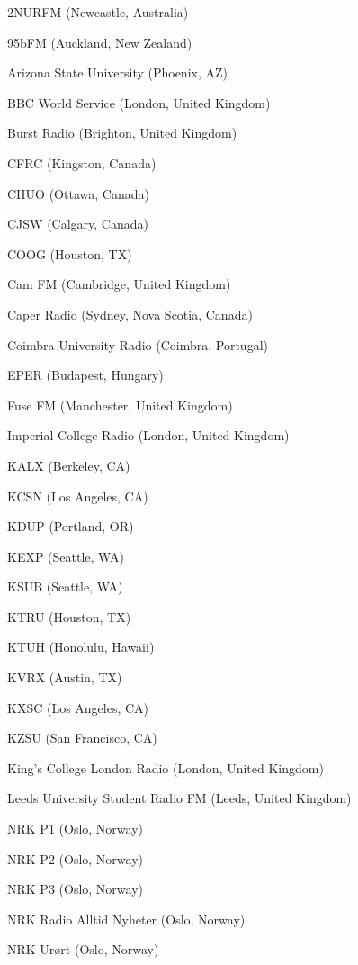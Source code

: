 \documentclass[20pt,landscape]{foils}
\begin{document}
\begin{list1}
\item
  \begin{list2}
  \item 2NURFM (Newcastle, Australia)
  \item 95bFM (Auckland, New Zealand)
  \item Arizona State University (Phoenix, AZ)
  \item BBC World Service (London, United Kingdom)
  \item Burst Radio (Brighton, United Kingdom)
  \item CFRC (Kingston, Canada)
  \item CHUO (Ottawa, Canada)
  \item CJSW (Calgary, Canada)
  \item COOG (Houston, TX)
  \item Cam FM (Cambridge, United Kingdom)
  \item Caper Radio (Sydney, Nova Scotia, Canada)
  \item Coimbra University Radio (Coimbra, Portugal)
  \item EPER (Budapest, Hungary)
  \item Fuse FM (Manchester, United Kingdom)
  \item Imperial College Radio (London, United Kingdom)
  \item KALX (Berkeley, CA)
  \item KCSN (Los Angeles, CA)
  \item KDUP (Portland, OR)
  \item KEXP (Seattle, WA)
  \item KSUB (Seattle, WA)
  \item KTRU (Houston, TX)
  \item KTUH (Honolulu, Hawaii)
  \item KVRX (Austin, TX)
  \item KXSC (Los Angeles, CA)
  \item KZSU (San Francisco, CA)
  \item King's College London Radio (London, United Kingdom)
  \item Leeds University Student Radio FM (Leeds, United Kingdom)
  \item NRK P1 (Oslo, Norway)
  \item NRK P2 (Oslo, Norway)
  \item NRK P3 (Oslo, Norway)
  \item NRK Radio Alltid Nyheter (Oslo, Norway)
  \item NRK Ur{\o}rt (Oslo, Norway)

\end{list2}
\end{list1}
\end{document}
